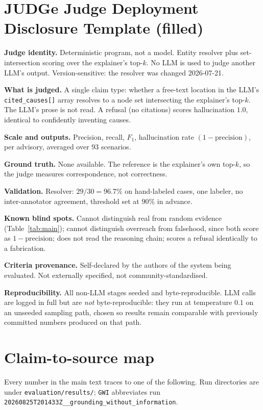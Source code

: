 \documentclass{article}
\begin{document}
\appendix

\section{JUDGe Judge Deployment Disclosure Template (filled)}
\label{app:disclosure}

\textbf{Judge identity.} Deterministic program, not a model. Entity resolver plus
set-intersection scoring over the explainer's top-$k$. No LLM is used to judge
another LLM's output. Version-sensitive: the resolver was changed 2026-07-21.

\textbf{What is judged.} A single claim type: whether a free-text location in the
LLM's \texttt{cited\_causes[]} array resolves to a node set intersecting the
explainer's top-$k$. The LLM's prose is not read. A refusal (no citations) scores
hallucination $1.0$, identical to confidently inventing causes.

\textbf{Scale and outputs.} Precision, recall, $F_1$, hallucination rate
$(1-\text{precision})$, per advisory, averaged over 93 scenarios.

\textbf{Ground truth.} None available. The reference is the explainer's own
top-$k$, so the judge measures correspondence, not correctness.

\textbf{Validation.} Resolver: $29/30 = 96.7\%$ on hand-labeled cases, one
labeler, no inter-annotator agreement, threshold set at $90\%$ in advance.

\textbf{Known blind spots.} Cannot distinguish real from random evidence
(Table~\ref{tab:main}); cannot distinguish overreach from falsehood, since both
score as $1-\text{precision}$; does not read the reasoning chain; scores a
refusal identically to a fabrication.

\textbf{Criteria provenance.} Self-declared by the authors of the system being
evaluated. Not externally specified, not community-standardised.

\textbf{Reproducibility.} All non-LLM stages seeded and byte-reproducible. LLM
calls are logged in full but are \emph{not} byte-reproducible: they run at
temperature $0.1$ on an unseeded sampling path, chosen so results remain
comparable with previously committed numbers produced on that path.

\section{Claim-to-source map}
\label{app:sources}

Every number in the main text traces to one of the following. Run directories are
under \texttt{evaluation/results/}; \texttt{GWI} abbreviates run
\texttt{20260825T201433Z\_\_grounding\_without\_information}.
\end{document}
